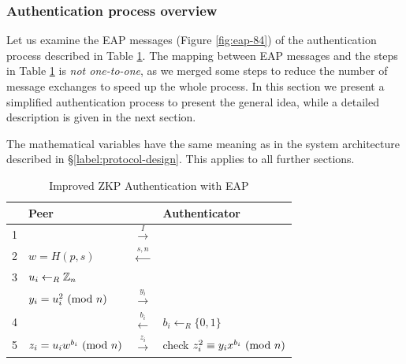 \subsubsection{Authentication process overview}
Let us examine the EAP messages (Figure \ref{fig:eap-84}) of the authentication process described in Table \ref{table:zkp-qrp-2}.
The mapping between EAP messages and the steps in Table \ref{table:zkp-qrp-2} is \textit{not one-to-one}, as we merged some steps to reduce the number of message exchanges to speed up the whole process.
In this section we present a simplified authentication process to present the general idea, while a detailed description is given in the next section.

The mathematical variables have the same meaning as in the system architecture described in \S\ref{label:protocol-design}. This applies to all further sections.
\begin{table}[h!]
	\centering
	\caption{Improved ZKP Authentication with EAP}
	\vspace{0.2cm}
	\begin{tabular}{l|l|c|l}
  		& Peer & & Authenticator\\
  		\hline
  		1 & & $\xrightarrow{I}$ &\\
		2 & $w = H(p, s)$ & $\xleftarrow{s,n}$ & \\
		\hline
		3 & $u_i \leftarrow_R \Bbb{Z}_{n}$ &  \\
		& $y_i = u_i^2 \ (\mathrm{mod}\ n)$ & $\xrightarrow{y_i}$ \\
		4 & & $\xleftarrow{b_i}$ & $b_i \leftarrow_R \{0, 1\} $ \\
		5 & $z_i = u_iw^{b_i} \ (\mathrm{mod}\ n) $ & $\xrightarrow{z_i}$ & check $z_i^2 \equiv y_ix^{b_i} \ (\mathrm{mod}\ n)$\\
	\end{tabular}
	\label{table:zkp-qrp-2}
\end{table}


